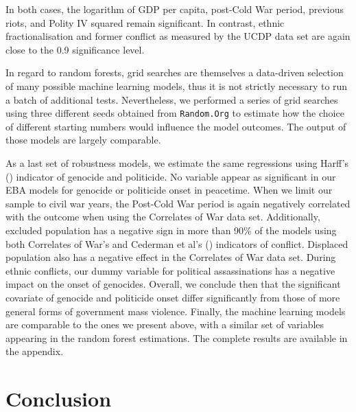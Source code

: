 In both cases, the logarithm of GDP per capita, post-Cold War period, previous riots, and Polity IV squared remain significant. In contrast, ethnic fractionalisation and former conflict as measured by the UCDP data set are again close to the 0.9 significance level. 

In regard to random forests, grid searches are themselves a data-driven selection of many possible machine learning models, thus it is not strictly necessary to run a batch of additional tests. Nevertheless, we performed a series of grid searches using three different seeds obtained from \texttt{Random.Org} to estimate how the choice of different starting numbers would influence the model outcomes. The output of those models are largely comparable.

As a last set of robustness models, we estimate the same regressions using Harff's (\citeyear{harff2003no}) indicator of genocide and politicide. No variable appear as significant in our EBA models for genocide or politicide onset in peacetime. When we limit our sample to civil war years, the Post-Cold War period is again negatively correlated with the outcome when using the Correlates of War data set. Additionally, excluded population has a negative sign in more than 90\% of the models using both Correlates of War’s and Cederman et al's (\citeyear{cederman2010ethnic}) indicators of conflict. Displaced population also has a negative effect in the Correlates of War data set. During ethnic conflicts, our dummy variable for political assassinations has a negative impact on the onset of genocides. Overall, we conclude then that the significant covariate of genocide and politicide onset differ significantly from those of more general forms of government mass violence. Finally, the machine learning models are comparable to the ones we present above, with a similar set of variables appearing in the random forest estimations. The complete results are available in the appendix.

\section{Conclusion}
\label{sec:conclusion4}

